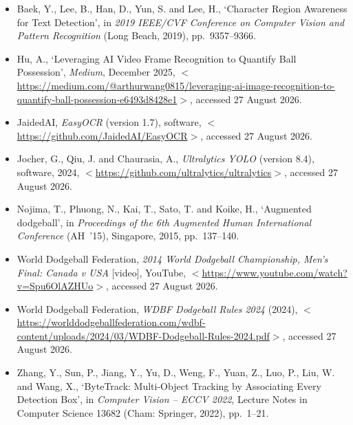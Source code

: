 \documentclass[10pt,a4paper]{article}
\begin{document}
\raggedright\sloppy
\begin{itemize}[leftmargin=1.4em,label={},itemsep=4pt]
\item Baek, Y., Lee, B., Han, D., Yun, S. and Lee, H., `Character Region Awareness for
Text Detection', in \emph{2019 IEEE/CVF Conference on Computer Vision and Pattern
Recognition} (Long Beach, 2019), pp.\ 9357--9366.
\item Hu, A., `Leveraging AI Video Frame Recognition to Quantify Ball Possession',
\emph{Medium}, December 2025,
$<$\url{https://medium.com/@arthurwang0815/leveraging-ai-image-recognition-to-quantify-ball-possession-e6493d8428e1}$>$,
accessed 27 August 2026.
\item JaidedAI, \emph{EasyOCR} (version 1.7), software,
$<$\url{https://github.com/JaidedAI/EasyOCR}$>$, accessed 27 August 2026.
\item Jocher, G., Qiu, J. and Chaurasia, A., \emph{Ultralytics YOLO} (version 8.4),
software, 2024, $<$\url{https://github.com/ultralytics/ultralytics}$>$, accessed
27 August 2026.
\item Nojima, T., Phuong, N., Kai, T., Sato, T. and Koike, H., `Augmented dodgeball', in
\emph{Proceedings of the 6th Augmented Human International Conference} (AH~'15),
Singapore, 2015, pp.\ 137--140.
\item World Dodgeball Federation, \emph{2014 World Dodgeball Championship, Men's Final:
Canada v USA} [video], YouTube, $<$\url{https://www.youtube.com/watch?v=Spu6OlAZHUo}$>$,
accessed 27 August 2026.
\item World Dodgeball Federation, \emph{WDBF Dodgeball Rules 2024} (2024),
$<$\url{https://worlddodgeballfederation.com/wdbf-content/uploads/2024/03/WDBF-Dodgeball-Rules-2024.pdf}$>$,
accessed 27 August 2026.
\item Zhang, Y., Sun, P., Jiang, Y., Yu, D., Weng, F., Yuan, Z., Luo, P., Liu, W. and
Wang, X., `ByteTrack: Multi-Object Tracking by Associating Every Detection Box', in
\emph{Computer Vision -- ECCV 2022}, Lecture Notes in Computer Science 13682 (Cham:
Springer, 2022), pp.\ 1--21.
\end{itemize}

\vspace{4mm}
\end{document}
